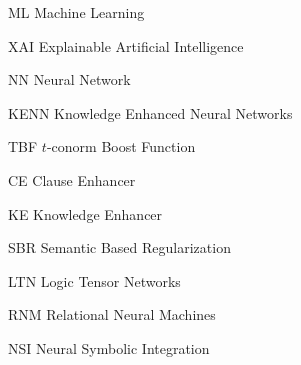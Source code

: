 \begin{abbreviations}
\item[ML] Machine Learning
\item[XAI] Explainable Artificial Intelligence
\item[NN] Neural Network
\item[KENN] Knowledge Enhanced Neural Networks
\item[TBF] $t$-conorm Boost Function
\item[CE] Clause Enhancer
\item[KE] Knowledge Enhancer
\item[SBR] Semantic Based Regularization
\item[LTN] Logic Tensor Networks
\item[RNM] Relational Neural Machines
\item[NSI] Neural Symbolic Integration
\end{abbreviations}

